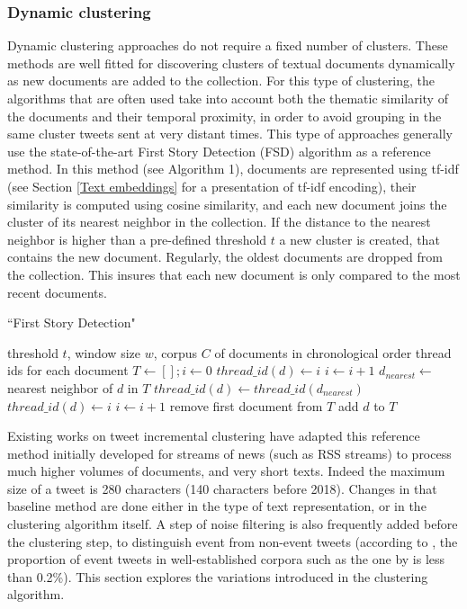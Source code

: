 	\subsubsection{Dynamic clustering \label{Subsubsec: incremental clustering}} Dynamic clustering approaches do not require a fixed number of clusters. These methods are well fitted for discovering clusters of textual documents dynamically as new documents are added to the collection. For this type of clustering, the algorithms that are often used take into account both the thematic similarity of the documents and their temporal proximity, in order to avoid grouping in the same cluster tweets sent at very distant times. This type of approaches generally use the state-of-the-art First Story Detection (FSD) \citep{allan_introduction_2002} algorithm as a reference method. In this method (see Algorithm 1), documents are represented using tf-idf (see Section \ref{Text embeddings} for a presentation of tf-idf encoding), their similarity is computed using cosine similarity, and each new document joins the cluster of its nearest neighbor in the collection. If the distance to the nearest neighbor is higher than a pre-defined threshold $t$ a new cluster is created, that contains the new document. Regularly, the oldest documents are dropped from the collection. This insures that each new document is only compared to the most recent documents. 

\begin{algorithm}
\caption{``First Story Detection"}
\begin{algorithmic}[1]
\REQUIRE threshold $t$, window size $w$, corpus $C$ of documents in chronological order
\ENSURE thread ids for each document
\STATE $T \leftarrow \left[ \right] ; i \leftarrow 0 $
\STATE $thread\_id(d) \leftarrow i$
\STATE $i \leftarrow i+1$
\ELSE
\STATE $d_{nearest} \leftarrow $ nearest neighbor of $d$ in $T$
\STATE $thread\_id(d) \leftarrow thread\_id(d_{nearest})$
\ELSE
\STATE $thread\_id(d) \leftarrow i$
\STATE $i \leftarrow i+1$
\ENDIF
\ENDIF
{}
\STATE remove first document from $T$
\ENDIF
\STATE add $d$ to $T$
\ENDWHILE
\end{algorithmic}
\end{algorithm}



Existing works on tweet incremental clustering have adapted this reference method initially developed for streams of news (such as RSS streams) to process much higher volumes of documents, and very short texts. Indeed the maximum size of a tweet is 280 characters (140 characters before 2018). Changes in that baseline method are done either in the type of text representation, or in the clustering algorithm itself. A step of noise filtering is also frequently added before the clustering step, to distinguish event from non-event tweets (according to \citet{liu_reuters_2016}, the proportion of event tweets in well-established corpora such as the one by \citet{mcminn_building_2013} is less than 0.2\%). This section explores the variations introduced in the clustering algorithm.



